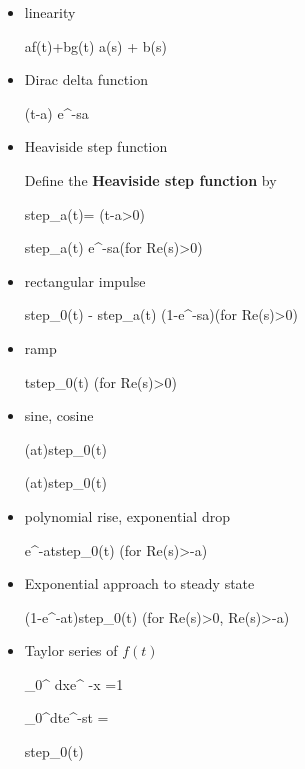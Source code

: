 \begin{itemize}

\item linearity

\beq
af(t)+bg(t)
\maparrow{\call}
a(s)
+ b(s)
\eeq

\item
Dirac delta function

\beq
\delta(t-a)
\maparrow{\call}
e^{-sa}
\eeq

\item 
Heaviside step function

Define the
{\bf Heaviside step function} by

\beq
step_a(t)=
\indi(t-a>0)
\eeq

\beq
step_a(t)
\maparrow{\call}
e^{-sa}\quad (for Re(s)>0)
\eeq

\item rectangular impulse

\beq
step_0(t) - step_a(t)
\maparrow{\call} 
(1-e^{-sa})\quad(for Re(s)>0)
\eeq

\item ramp

\beq
t\;step_0(t)
\maparrow{\call}
\quad(for Re(s)>0)
\eeq

\item sine, cosine

\beq
\sin(at)step_0(t) \maparrow{\call}
\eeq

\beq
\cos(at)step_0(t) \maparrow{\call}
\eeq

\item
polynomial rise, exponential drop

\beq
{}e^{-at}\;step_0(t)
\maparrow{\call}
\quad(for Re(s)>-a)
\eeq

\item Exponential approach to steady state

\beq
(1-e^{-at})step_0(t)
\maparrow{\call}
\quad (for Re(s)>0, Re(s)>-a)
\eeq



\item Taylor series of $f(t)$

\beq
\int_0^\infty
dx\;e^{ -x} 
=1
\eeq

\beq
\int_0^\infty dt\;e^{-st} 
=
\eeq

\beq
{}step_0(t)
\maparrow{\call}
\eeq


\end{itemize}
